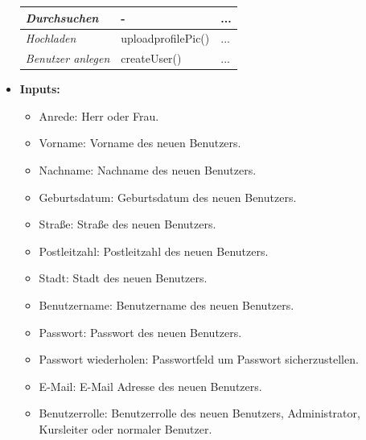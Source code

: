 \begin{itemize}
\begin{center}
\begin{longtable}{|p{4cm} |p{6cm} | p{4cm}|}
					\textit{Durchsuchen} & - & ... \\ \hline
					\textit{Hochladen} &  uploadprofilePic() & ... \\ \hline
					\textit{Benutzer anlegen} & createUser() & ... \\ \hline
				\end{longtable}
			\end{center}
			\item \textbf{Inputs:}
			\begin{itemize}
				\item Anrede: Herr oder Frau.
				\item Vorname: Vorname des neuen Benutzers.
				\item Nachname: Nachname des neuen Benutzers.
				\item Geburtsdatum: Geburtsdatum des neuen Benutzers.
				\item Straße: Straße des neuen Benutzers.
				\item Postleitzahl: Postleitzahl des neuen Benutzers.
				\item Stadt: Stadt des neuen Benutzers.
				\item Benutzername: Benutzername des neuen Benutzers.
				\item Passwort: Passwort des neuen Benutzers.
				\item Passwort wiederholen: Passwortfeld um Passwort sicherzustellen.
				\item E-Mail: E-Mail Adresse des neuen Benutzers.
				\item Benutzerrolle: Benutzerrolle des neuen Benutzers, Administrator, Kursleiter oder normaler Benutzer.
				\end{itemize}
				
				\begin{center}
					\begin{longtable}{|p{3cm} |p{4cm} | p{4cm}|p{3cm} |p{2cm}|}
						

\end{longtable}
\end{center}
\end{itemize}
